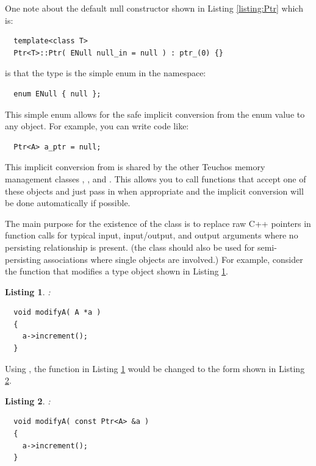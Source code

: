 \documentclass[pdf,ps2pdf,11pt]{SANDreport}
\newtheorem{listing}{Listing}
\begin{document}
One note about the default null constructor shown in Listing
{}\ref{listing:Ptr} which is:

{\small\begin{verbatim}
  template<class T>
  Ptr<T>::Ptr( ENull null_in = null ) : ptr_(0) {}
\end{verbatim}}

{}\noindent{}is that the type {} is the simple enum in
the {} namespace:

{\small\begin{verbatim}
  enum ENull { null };
\end{verbatim}}

This simple enum allows for the safe implicit conversion from the enum
value {} to any {} object.  For example,
you can write code like:

{\small\begin{verbatim}
  Ptr<A> a_ptr = null;
\end{verbatim}}

This implicit conversion from {} is shared by the other
Teuchos memory management classes {},
{}, and {}.  This allows you
to call functions that accept one of these objects and just pass in
{} when appropriate and the implicit conversion will be
done automatically if possible.

The main purpose for the existence of the {} class is to
replace raw C++ pointers in function calls for typical input,
input/output, and output arguments where no persisting relationship is
present.  (the class {} should also be used for
semi-persisting associations where single objects are involved.)  For
example, consider the function that modifies a type {}
object shown in Listing {}\ref{listing:modifyA-rawPtr}.

\begin{listing}:\\
\label{listing:modifyA-rawPtr}
{\small\begin{verbatim}
  void modifyA( A *a )
  {
    a->increment();
  }
\end{verbatim}}
\end{listing}

Using {}, the function {} in Listing
{}\ref{listing:modifyA-rawPtr} would be changed to the form shown in
Listing {}\ref{listing:modifyA-Ptr}.

\begin{listing}:\\
\label{listing:modifyA-Ptr}
{\small\begin{verbatim}
  void modifyA( const Ptr<A> &a )
  {
    a->increment();
  }
\end{verbatim}}
\end{listing}
\end{document}
